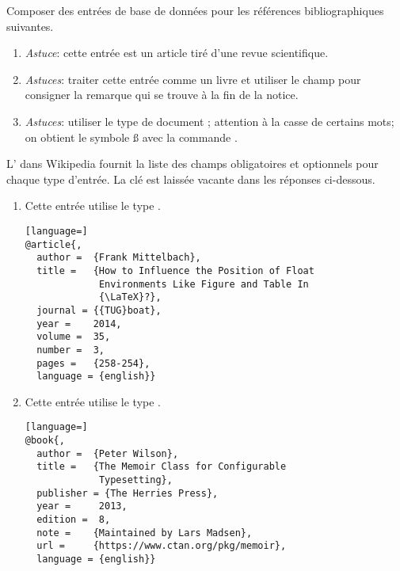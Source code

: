\begin{exercice}
  Composer des entrées de base de données pour les références
  bibliographiques suivantes.
  \begin{enumerate}
  \item {}

    \emph{Astuce}: cette entrée est un article tiré d'une revue
    scientifique.

  \item {}

    \emph{Astuces}: traiter cette entrée comme un livre et utiliser le
    champ  pour consigner la remarque qui se trouve à la
    fin de la notice.

  \item {}

    \emph{Astuces}: utiliser le type de document ;
    attention à la casse de certains mots; on obtient le symbole {\ss}
    avec la commande \cmdprint{\ss}.
  \end{enumerate}
  \begin{sol}
    L'
    dans Wikipedia fournit la liste des champs obligatoires et
    optionnels pour chaque type d'entrée. La clé est laissée vacante
    dans les réponses ci-dessous.
    \begin{enumerate}
    \item Cette entrée utilise le type .
\begin{lstlisting}[language=]
@article{,
  author =  {Frank Mittelbach},
  title =   {How to Influence the Position of Float
             Environments Like Figure and Table In
             {\LaTeX}?},
  journal = {{TUG}boat},
  year =    2014,
  volume =  35,
  number =  3,
  pages =   {258-254},
  language = {english}}
\end{lstlisting}

    \item Cette entrée utilise le type .
\begin{lstlisting}[language=]
@book{,
  author =  {Peter Wilson},
  title =   {The Memoir Class for Configurable
             Typesetting},
  publisher = {The Herries Press},
  year =     2013,
  edition =  8,
  note =    {Maintained by Lars Madsen},
  url =     {https://www.ctan.org/pkg/memoir},
  language = {english}}
\end{lstlisting}


\end{enumerate}
\end{sol}
\end{exercice}
